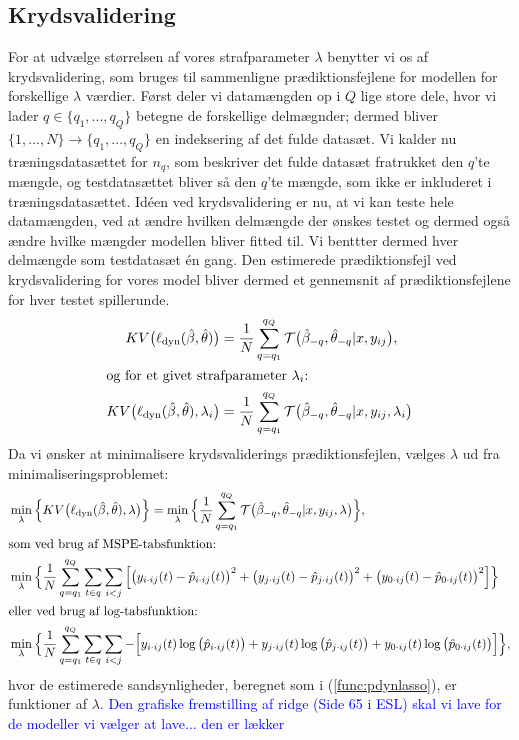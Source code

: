 \documentclass[11pt,a4paper]{article}
\begin{document}
\subsection{Krydsvalidering}
For at udvælge størrelsen af vores strafparameter $\lambda$ benytter vi os af krydsvalidering, som bruges til sammenligne prædiktionsfejlene for modellen for forskellige $\lambda$ værdier. Først deler vi datamængden op i $Q$ lige store dele, hvor vi lader $q\in \{q_1,...,q_Q\}$ betegne de forskellige delmægnder; dermed bliver $\{1,...,N\}\rightarrow\{q_1,...,q_Q\}$ en indeksering af det fulde datasæt. Vi kalder nu træningsdatasættet for $n_q$, som beskriver det fulde datasæt fratrukket den $q$'te mængde, og testdatasættet bliver så den $q$'te mængde, som ikke er inkluderet i træningsdatasættet. Idéen ved krydsvalidering er nu, at vi kan teste hele datamængden, ved at ændre hvilken delmængde der ønskes testet og dermed også ændre hvilke mængder modellen bliver fitted til. Vi benttter dermed hver delmængde som testdatasæt én gang. Den estimerede prædiktionsfejl ved krydsvalidering for vores model bliver dermed et gennemsnit
af prædiktionsfejlene for hver testet spillerunde. 
\begin{align*}
KV\big{(}\ell_{\text{dyn}}(\hat{\beta},\hat{\theta})\big{)}&=\frac{1}{N}\sum_{q=q_1}^{q_Q}\mathcal{T}\big{(}\hat{\beta}_{-q},\hat{\theta}_{-q}|x,y_{ij}\big{)},\\
\intertext{og for et givet strafparameter $\lambda_i$:}
KV\big{(}\ell_{\text{dyn}}(\hat{\beta},\hat{\theta}),\lambda_i\big{)}&=\frac{1}{N}\sum_{q=q_1}^{q_Q}\mathcal{T}\big{(}\hat{\beta}_{-q},\hat{\theta}_{-q}|x,y_{ij},\lambda_i\big{)}
\end{align*}
Da vi ønsker at minimalisere krydsvaliderings prædiktionsfejlen, vælges $\lambda$ ud fra minimaliseringsproblemet:
\begin{align*}
&\min_{\lambda}\Big{\{}KV\big{(}\ell_{\text{dyn}}(\hat{\beta},\hat{\theta}),\lambda \big{)}\Big{\}}=\min_{\lambda}\Big{\{}\frac{1}{N}\sum_{q=q_1}^{q_Q}\mathcal{T}\big{(}\hat{\beta}_{-q},\hat{\theta}_{-q}|x,y_{ij},\lambda\big{)}\Big{\}},\\
\intertext{som ved brug af MSPE-tabsfunktion:}
&\min_{\lambda}\Big{\{}\frac{1}{N}\sum_{q=q_1}^{q_Q}\sum_{t\in q}\sum_{i<j}\Big{[}\big{(}y_{i\cdot ij}(t)-\hat{p}_{i\cdot ij}(t)\big{)}^2+\big{(}y_{j\cdot ij}(t)-\hat{p}_{j\cdot ij}(t)\big{)}^2+\big{(}y_{0\cdot ij}(t)-\hat{p}_{0\cdot ij}(t)\big{)}^2\Big{]}\Big{\}}\\
\intertext{eller ved brug af log-tabsfunktion:}
&\min_{\lambda}\Big{\{}\frac{1}{N}\sum_{q=q_1}^{q_Q}\sum_{t\in q}\sum_{i<j}-\Big{[}y_{i\cdot ij}(t)\log\big{(}\hat{p}_{i\cdot ij}(t)\big{)}+y_{j\cdot ij}(t)\log\big{(}\hat{p}_{j\cdot ij}(t)\big{)}+y_{0\cdot ij}(t)\log\big{(}\hat{p}_{0\cdot ij}(t)\big{)}\Big{]}\Big{\}},
\end{align*}
hvor de estimerede sandsynligheder, beregnet som i (\ref{func:pdynlasso}), er funktioner af $\lambda$.
\textcolor{blue}{Den grafiske fremstilling af ridge (Side 65 i ESL) skal vi lave for de modeller vi vælger at lave... den er lækker}
\end{document}
